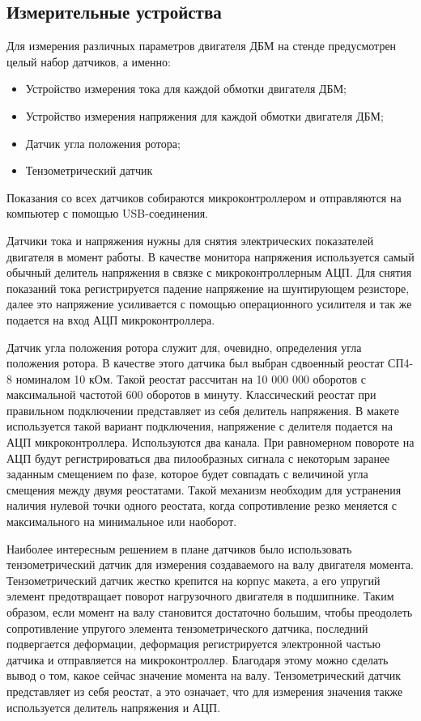 \subsection{Измерительные устройства}

Для измерения различных параметров двигателя ДБМ на стенде предусмотрен целый набор датчиков,
а именно:

\begin{itemize}
  \item Устройство измерения тока для каждой обмотки двигателя ДБМ;
  \item Устройство измерения напряжения для каждой обмотки двигателя ДБМ;
  \item Датчик угла положения ротора;
  \item Тензометрический датчик
\end{itemize}

Показания со всех датчиков собираются микроконтроллером и отправляются на компьютер
с помощью USB-соединения.

Датчики тока и напряжения нужны для снятия электрических показателей двигателя в момент работы.
В качестве монитора напряжения используется самый обычный делитель напряжения в связке
с микроконтроллерным АЦП. Для снятия показаний тока регистрируется падение напряжение на 
шунтирующем резисторе, далее это напряжение усиливается с помощью операционного усилителя и так же
подается на вход АЦП микроконтроллера.

Датчик угла положения ротора служит для, очевидно, определения угла положения ротора.
В качестве этого датчика был выбран сдвоенный реостат СП4-8 номиналом 10 кОм. Такой реостат
рассчитан на 10 000 000 оборотов с максимальной частотой 600 оборотов в минуту. 
Классический реостат при правильном подключении представляет из себя делитель напряжения. 
В макете используется такой вариант подключения, напряжение с делителя подается на АЦП 
микроконтроллера. Используются два канала.
При равномерном повороте на АЦП будут регистрироваться два пилообразных сигнала с
некоторым заранее заданным смещением по фазе, которое будет совпадать с величиной угла смещения 
между двумя реостатами. Такой механизм необходим для устранения
наличия нулевой точки одного реостата, когда сопротивление резко меняется с максимального
на минимальное или наоборот.

Наиболее интересным решением в плане датчиков было использовать тензометрический датчик
для измерения создаваемого на валу двигателя момента. Тензометрический датчик жестко крепится
на корпус макета, а его упругий элемент предотвращает поворот нагрузочного двигателя в подшипнике.
Таким образом, если момент на валу становится достаточно большим, чтобы преодолеть сопротивление
упругого элемента тензометрического датчика, последний подвергается деформации, деформация 
регистрируется
электронной частью датчика и отправляется на микроконтроллер. Благодаря этому можно сделать вывод
о том, какое сейчас значение момента на валу. Тензометрический датчик представляет из себя
реостат, а это означает, что для измерения значения также используется делитель напряжения и АЦП.

